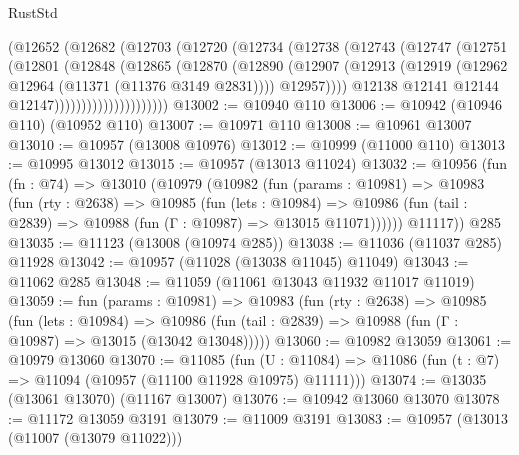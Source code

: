 \begin{lexlean}{RustStd}
\begin{coremodule}
                      (@12652
                        (@12682
                          (@12703
                            (@12720
                              (@12734
                                (@12738
                                  (@12743
                                    (@12747
                                      (@12751
                                        (@12801
                                          (@12848
                                            (@12865
                                              (@12870
                                                (@12890
                                                  (@12907
                                                    (@12913
                                                      (@12919
                                                        (@12962
                                                          @12964
                                                          (@11371 (@11376 @3149 @2831))))
                                                      @12957))))
                                              @12138
                                              @12141
                                              @12144
                                              @12147)))))))))))))))))))))
@13002 := @10940 @110
@13006 := @10942 (@10946 @110) (@10952 @110)
@13007 := @10971 @110
@13008 := @10961 @13007
@13010 := @10957 (@13008 @10976)
@13012 := @10999 (@11000 @110)
@13013 := @10995 @13012
@13015 := @10957 (@13013 @11024)
@13032 := @10956
    (fun (fn : @74) =>
    @13010
      (@10979
        (@10982
          (fun (params : @10981) =>
          @10983
            (fun (rty : @2638) =>
            @10985
              (fun (lets : @10984) =>
              @10986 (fun (tail : @2839) => @10988 (fun (Γ : @10987) => @13015 @11071))))))
        @11117))
    @285
@13035 := @11123 (@13008 (@10974 @285))
@13038 := @11036 (@11037 @285) @11928
@13042 := @10957 (@11028 (@13038 @11045) @11049)
@13043 := @11062 @285
@13048 := @11059 (@11061 @13043 @11932 @11017 @11019)
@13059 := fun (params : @10981) =>
  @10983
    (fun (rty : @2638) =>
    @10985
      (fun (lets : @10984) =>
      @10986 (fun (tail : @2839) => @10988 (fun (Γ : @10987) => @13015 (@13042 @13048)))))
@13060 := @10982 @13059
@13061 := @10979 @13060
@13070 := @11085
    (fun (U : @11084) => @11086 (fun (t : @7) => @11094 (@10957 (@11100 @11928 @10975) @11111)))
@13074 := @13035 (@13061 @13070) (@11167 @13007)
@13076 := @10942 @13060 @13070
@13078 := @11172 @13059 @3191
@13079 := @11009 @3191
@13083 := @10957 (@13013 (@11007 (@13079 @11022)))

\end{coremodule}
\end{lexlean}

